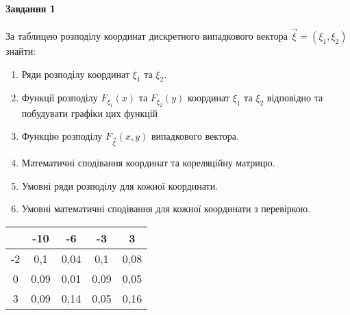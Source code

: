 \documentclass[a4paper, 20pt, titlepage]{article}
\begin{document}
	\newcommand \setxy[2]{
	\Biggl\{ (x,y) \biggm|
	\begin{aligned} x &> #1, \\
	y &> #2 
	\end{aligned}
	\Biggr\}
}

	\newcommand \inter[4]{при \,\, (#1 < x \leqslant #2) \wedge (#3 < y \leqslant #4)}

	\newcommand \interx[3]{при \,\, (x > #1) \wedge (#2 < y \leqslant #3)}
	
	\newcommand \intery[3]{при \,\, (#1 < x \leqslant #2) \wedge (y > #3)}

	\newcommand \interxy[2]{при \,\, ( x > #1) \wedge (y > #2)}


	\newcommand \cpo[2]{P\left\{\xi_1 = #1 / \xi_2 = #2 \right\} }
	\newcommand \cpt[2]{P\left\{\xi_2 = #1 / \xi_1 = #2 \right\} }




\paragraph{Завдання 1} За таблицею розподілу координат дискретного випадкового вектора $\vec{\xi} = \left(\xi_1, \xi_2\right)$ знайти:

\begin{enumerate}
	\item Ряди розподілу координат $\xi_1$ та $\xi_2$.
	\item Функції розподілу $F_{\xi_1}(x)$ та $F_{\xi_2}(y)$ координат $\xi_1$ та $\xi_2$ відповідно та побудувати графіки цих функцій
	\item Функцію розподілу $F_{\vec{\xi}}(x,y)$ випадкового вектора.
	\item Математичні сподівання координат та кореляційну матрицю.
	\item Умовні ряди розподілу для кожної координати.
	\item Умовні математичні сподівання для кожної координати з перевіркою.
\end{enumerate}

\begin{center}
\begin{tabular}{| c | c | c | c | c |}
	\hline
	\backslashbox{$\xi_1$}{$\xi_2$} & -10 & -6 & -3 & 3 \\ \hline
	-2 & 0,1 & 0,04 & 0,1 & 0,08 \\ \hline
	0 & 0,09 & 0,01 & 0,09 & 0,05 \\ \hline
	3 & 0,09 & 0,14 & 0,05 & 0,16 \\
	\hline 
\end{tabular}
\end{center}
\end{document}
